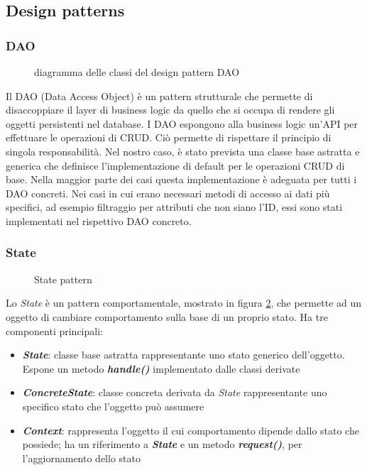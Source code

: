 \documentclass{article}
\begin{document}
  \subsection{Design patterns}

  \subsubsection{DAO}
  \begin{figure}[H]
    \centering
    
    \caption{diagramma delle classi del design pattern DAO}
    \label{fig:daoPattern}
  \end{figure}
  Il DAO (Data Access Object) è un pattern strutturale che permette di disaccoppiare il layer di business logic da quello che si occupa di rendere gli oggetti persistenti nel database. I DAO espongono alla business logic un'API per effettuare le operazioni di CRUD. Ciò permette di rispettare il principio di singola responsabilità.
  Nel nostro caso, è stato prevista una classe base astratta e generica che definisce l'implementazione di default per le operazioni CRUD di base. Nella maggior parte dei casi questa implementazione è adeguata per tutti i DAO concreti. Nei casi in cui erano necessari metodi di accesso ai dati più specifici, ad esempio filtraggio per attributi che non siano l'ID, essi sono stati implementati nel rispettivo DAO concreto.

  \subsubsection{State}
  \label{sec:statePattern}

  \begin{figure}[H]
    \centering
    
    \caption{State pattern}
    \label{fig:statePattern}
  \end{figure}

  Lo \textit{State} è un pattern comportamentale, mostrato in figura \ref{fig:statePattern}, che permette ad un oggetto di cambiare comportamento sulla base di un proprio stato. Ha tre componenti principali:
  \begin{itemize}
    \item \textbf{\textit{State}}: classe base astratta rappresentante uno stato generico dell'oggetto. Espone un metodo \textbf{\textit{handle()}} implementato dalle classi derivate
    \item \textbf{\textit{ConcreteState}}: classe concreta derivata da \textit{State} rappresentante uno specifico stato che l'oggetto può assumere
    \item \textbf{\textit{Context}}: rappresenta l'oggetto il cui comportamento dipende dallo stato che possiede; ha un riferimento a \textbf{\textit{State}} e un metodo \textbf{\textit{request()}}, per l'aggiornamento dello stato
  \end{itemize}
\end{document}
